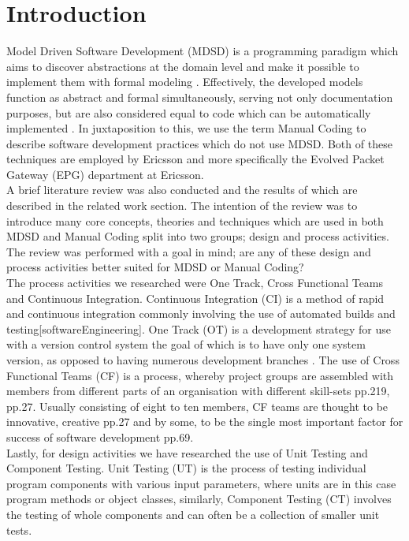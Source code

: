 \documentclass[fina_report_innit.tex]{subfiles}
\begin{document}
\section{Introduction}

Model Driven Software Development (MDSD) is a programming paradigm which aims to discover abstractions at the domain level and make it possible to implement them with formal modeling \cite{stahl2006model}. Effectively, the developed models function as abstract and formal simultaneously, serving not only documentation purposes, but are also considered equal to code which can be automatically implemented \cite{stahl2006model}. In juxtaposition to this, we use the term Manual Coding to describe software development practices which do not use MDSD. Both of these techniques are employed by Ericsson and more specifically the Evolved Packet Gateway (EPG) department at Ericsson.
\\

A brief literature review was also conducted and the results of which are described in the related work section. The intention of the review was to introduce many core concepts, theories and techniques which are used in both MDSD and Manual Coding split into two groups; design and process activities. The review was performed with a goal in mind; are any of these design and process activities better suited for MDSD or Manual Coding?
\\

The process activities we researched were One Track, Cross Functional Teams and Continuous Integration. Continuous Integration (CI) is a method of rapid and continuous integration commonly involving the use of automated builds and testing[softwareEngineering]. One Track (OT) is a development strategy for use with a version control system the goal of which is to have only one system version, as opposed to having numerous development branches \cite{hribar2008first}. The use of Cross Functional Teams (CF) is a process, whereby project groups are assembled with members from different parts of an organisation with different skill-sets \cite{henke1993perspective} pp.219, \cite{ghobadi2011challenges} pp.27. Usually consisting of eight to ten members, CF teams are thought to be innovative, creative \cite{ghobadi2011challenges} pp.27 and by some, to be the single most important factor for success of software development \cite{marchwinski2000technical} pp.69.
\\

Lastly, for design activities we have researched the use of Unit Testing and Component Testing. Unit Testing (UT) is the process of testing individual program components with various input parameters, where units are in this case program methods or object classes, similarly, Component Testing (CT) involves the testing of whole components and can often be a collection of smaller unit tests.
\\
\end{document}
